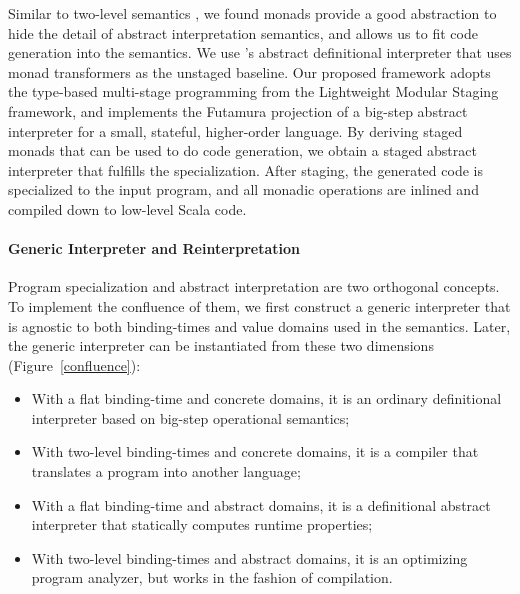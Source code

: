 Similar to two-level semantics \cite{NIELSON1989117}, we found
monads provide a good abstraction to hide the detail of abstract
interpretation semantics, and allows us to fit code generation into
the semantics. We use \citet{DBLP:journals/pacmpl/DaraisLNH17}'s
abstract definitional interpreter that uses monad transformers as the
unstaged baseline.  Our proposed framework adopts the type-based
multi-stage programming from the Lightweight Modular Staging framework,
and implements the Futamura projection of a big-step abstract
interpreter for a small, stateful, higher-order language. By deriving
staged monads that can be used to do code generation, we obtain a
staged abstract interpreter that fulfills the specialization. After
staging, the generated code is specialized to the input program, and
all monadic operations are inlined and compiled down to low-level
Scala code.



\paragraph{Generic Interpreter and Reinterpretation}

Program specialization and abstract interpretation are two orthogonal
concepts.  To implement the confluence of them, we first construct a
generic interpreter that is agnostic to both binding-times and value
domains used in the semantics.  Later, the generic interpreter can be
instantiated from these two dimensions (Figure~\ref{confluence}):
\begin{itemize}
\item With a flat binding-time and concrete domains, it is an ordinary
  definitional interpreter based on big-step operational semantics;
\item With two-level binding-times and concrete domains, it is a
  compiler that translates a program into another language;
\item With a flat binding-time and abstract domains, it is a
  definitional abstract interpreter \cite{DBLP:journals/pacmpl/DaraisLNH17}
  that statically computes runtime properties;
\item With two-level binding-times and abstract domains, it is an optimizing
  program analyzer, but works in the fashion of compilation.
\end{itemize}

